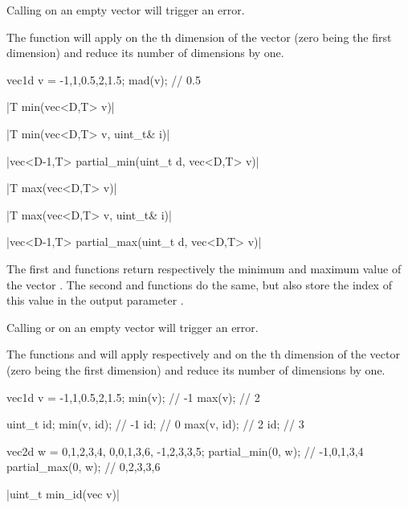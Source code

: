 Calling  on an empty vector will trigger an error.

The function  will apply  on the th dimension of the vector (zero being the first dimension) and reduce its number of dimensions by one.

\begin{example}
\begin{cppcode}
vec1d v = {-1,1,0.5,2,1.5};
mad(v); // 0.5
\end{cppcode}
\end{example}

\funcitem \cppinline|T min(vec<D,T> v)| 

\cppinline|T min(vec<D,T> v, uint_t& i)|

\cppinline|vec<D-1,T> partial_min(uint_t d, vec<D,T> v)| 

\cppinline|T max(vec<D,T> v)| 

\cppinline|T max(vec<D,T> v, uint_t& i)|

\cppinline|vec<D-1,T> partial_max(uint_t d, vec<D,T> v)| 

The first  and  functions return respectively the minimum and maximum value of the vector . The second  and  functions do the same, but also store the index of this value in the output parameter .

Calling  or  on an empty vector will trigger an error.

The functions  and  will apply respectively  and  on the th dimension of the vector (zero being the first dimension) and reduce its number of dimensions by one.

\begin{example}
\begin{cppcode}
vec1d v = {-1,1,0.5,2,1.5};
min(v); // -1
max(v); // 2

uint_t id;
min(v, id); // -1
id;         // 0
max(v, id); // 2
id;         // 3

vec2d w = {{0,1,2,3,4}, {0,0,1,3,6}, {-1,2,3,3,5}};
partial_min(0, w); // {-1,0,1,3,4}
partial_max(0, w); // {0,2,3,3,6}
\end{cppcode}
\end{example}

\funcitem \cppinline|uint_t min_id(vec v)| 

